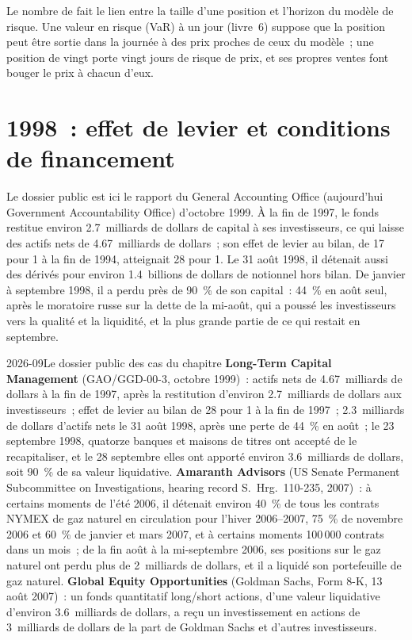 Le nombre de  fait le lien entre la taille d'une position et l'horizon du modèle de risque. Une valeur en risque (VaR) à un jour (livre~6) suppose que la position peut être
sortie dans la journée à des prix proches de ceux du modèle~; une position de vingt  porte vingt jours de risque de prix, et ses propres ventes font bouger le
prix à chacun d'eux.

\section{1998~: effet de levier et conditions de financement}

Le dossier public est ici le rapport du General Accounting Office (aujourd'hui Government Accountability Office) d'octobre 1999. À la fin de 1997, le fonds
restitue environ 2.7~milliards de dollars de capital à ses investisseurs, ce qui laisse des actifs nets de 4.67~milliards de dollars~; son effet de levier au bilan, de 17 pour 1 à la fin de 1994,
atteignait 28 pour 1. Le 31 août 1998, il détenait aussi des dérivés pour environ 1.4~billions de dollars de notionnel hors bilan. De janvier à septembre 1998, il
a perdu près de 90~\% de son capital~: 44~\% en août seul, après le moratoire russe sur la dette de la mi-août, qui a poussé les investisseurs vers la qualité et la liquidité, et la plus grande partie de ce qui restait en septembre.

\begin{dated}{2026-09}{Le dossier public des cas du chapitre}\label{dat:fm:case-studies-i:record}
\textbf{Long-Term Capital Management} (GAO/GGD-00-3, octobre 1999)~: actifs nets de 4.67~milliards de dollars à la fin de 1997, après la restitution d'environ 2.7~milliards de dollars
aux investisseurs~; effet de levier au bilan de 28 pour 1 à la fin de 1997~; 2.3~milliards de dollars d'actifs nets le 31 août 1998, après une perte de 44~\% en août~; le 23
septembre 1998, quatorze banques et maisons de titres ont accepté de le recapitaliser, et le 28 septembre elles ont apporté environ 3.6~milliards de dollars, soit 90~\% de sa
valeur liquidative. \textbf{Amaranth Advisors} (US Senate Permanent Subcommittee on Investigations, hearing record S.~Hrg.~110-235, 2007)~: à certains moments de l'été
2006, il détenait environ 40~\% de tous les contrats NYMEX de gaz naturel en circulation pour l'hiver 2006--2007, 75~\% de novembre 2006 et 60~\% de janvier et
mars 2007, et à certains moments 100\,000 contrats dans un mois~; de la fin août à la mi-septembre 2006, ses positions sur le gaz naturel ont perdu plus de
2~milliards de dollars, et il a liquidé son portefeuille de gaz naturel. \textbf{Global Equity Opportunities} (Goldman Sachs, Form 8-K, 13 août 2007)~: un fonds quantitatif
long/short actions, d'une valeur liquidative d'environ 3.6~milliards de dollars, a reçu un investissement en actions de 3~milliards de dollars de la part de Goldman Sachs et d'autres investisseurs.
\end{dated}

